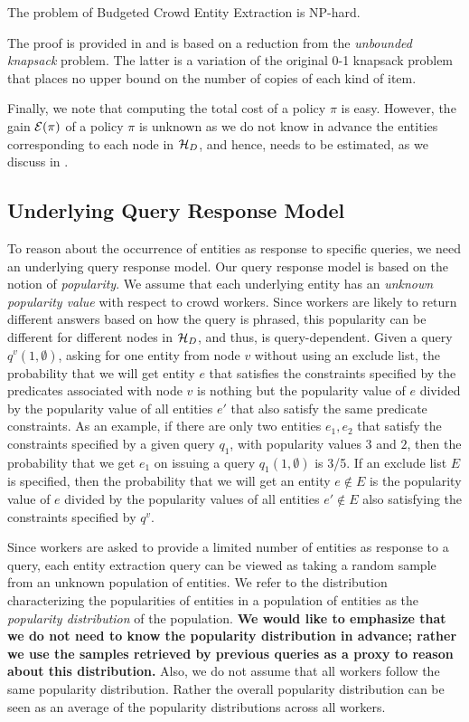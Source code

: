 \begin{theorem}
The problem of Budgeted Crowd Entity Extraction is NP-hard.
\end{theorem}
The proof is provided in  and is based on a reduction from the {\em unbounded knapsack} problem. The latter is a variation of the original 0-1 knapsack problem that places no upper bound on the number of copies of each kind of item.

Finally, we note that computing the total cost of a policy $\pi$ is easy. However, the gain $\mathcal{E}(\pi)$ of a policy $\pi$ is unknown as we do not know in advance the entities corresponding to each node in $\mathcal{H}_D$, and hence, needs to be estimated, as we discuss in . 

\subsection{Underlying Query Response Model}
\label{sec:sampling}
To reason about the occurrence of entities as response to specific queries, we need an underlying query response model. Our query response model is based on the notion of {\em popularity}.
\ifpaper We assume that each underlying entity has an {\em unknown popularity value} with respect to crowd workers. Since workers are likely to return different answers based on how the query is phrased, this popularity can be different for different nodes in $\mathcal{H}_D$, and thus, is query-dependent. 
Given a query $q^v(1, \emptyset)$, asking for one entity from node $v$ without using an exclude list, the probability that we will get entity $e$ that satisfies the constraints specified by the predicates associated with node $v$ is nothing but the popularity value of $e$ divided by the popularity value of all entities $e'$ that also satisfy the same predicate constraints. As an example, if there are only two entities $e_1, e_2$ that satisfy the constraints specified by a given query $q_1$, with popularity values $3$ and $2$, then the probability that we get $e_1$ on issuing a query $q_1(1, \emptyset)$ is 3/5. If an exclude list $E$ is specified, then the probability that we will get an entity $e \notin E$ is the popularity value of $e$ divided by the popularity values of all entities $e' \notin E$ also satisfying the constraints specified by $q^v$. 

Since workers are asked to provide a limited number of entities as response to a query, each entity extraction query can be viewed as taking a random sample from an unknown population of entities. We refer to the distribution characterizing the popularities of entities in a population of entities as the {\em popularity distribution} of the population. {\bf We would like to emphasize that we do not need to know the popularity distribution in advance; rather we use the samples retrieved by previous queries as a proxy to reason about this distribution.} Also, we do not assume that all workers follow the same popularity distribution. Rather the overall popularity distribution can be seen as an average of the popularity distributions across all workers.

